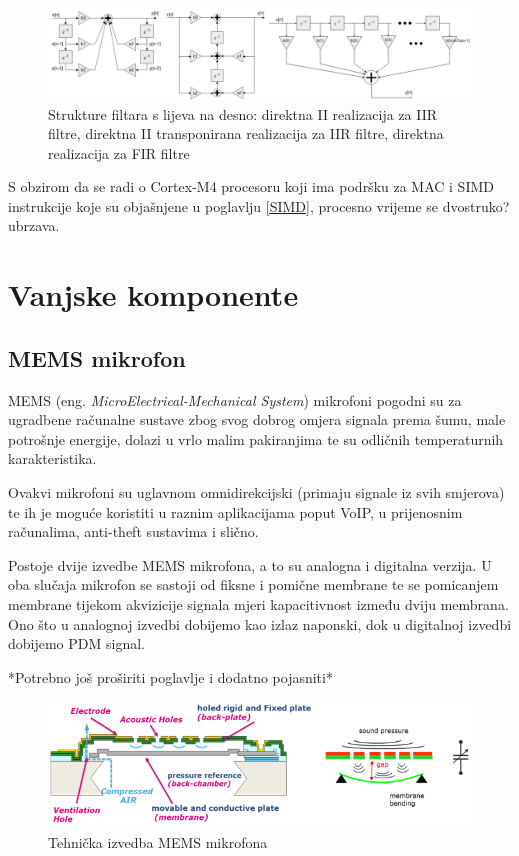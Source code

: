 \documentclass[times, utf8, diplomski]{fer}
\begin{document}
\begin{figure}[hbt!]
 \centering
 \includegraphics[scale=0.2]{photos/filtstruct.png}
 \caption{Strukture filtara s lijeva na desno: direktna II realizacija za IIR filtre, direktna II transponirana realizacija za IIR filtre, direktna realizacija za FIR filtre}
 \label{struct}
\end{figure}

S obzirom da se radi o Cortex-M4 procesoru koji ima podršku za MAC i SIMD instrukcije koje su objašnjene u poglavlju \ref{SIMD}, procesno vrijeme se dvostruko? ubrzava.

\section{Vanjske komponente}
\subsection{MEMS mikrofon}
MEMS (eng. \textit{MicroElectrical-Mechanical System}) mikrofoni pogodni su za ugradbene računalne sustave zbog svog dobrog omjera signala prema šumu, male potrošnje energije, dolazi u vrlo malim pakiranjima te su odličnih temperaturnih karakteristika.

Ovakvi mikrofoni su uglavnom omnidirekcijski (primaju signale iz svih smjerova) te ih je moguće koristiti u raznim aplikacijama poput VoIP, u prijenosnim računalima, anti-theft sustavima i slično.

Postoje dvije izvedbe MEMS mikrofona, a to su analogna i digitalna verzija. U oba slučaja mikrofon se sastoji od fiksne i pomične membrane te se pomicanjem membrane tijekom akvizicije signala mjeri kapacitivnost između dviju membrana. Ono što u analognoj izvedbi dobijemo kao izlaz naponski, dok u digitalnoj izvedbi dobijemo PDM signal.

*Potrebno još proširiti poglavlje i dodatno pojasniti*

\begin{figure}[hbt!]
 \centering
 \includegraphics[scale=0.8]{photos/gradjamems.png}
 \caption{Tehnička izvedba MEMS mikrofona}
 \label{MEMS}
\end{figure}
\end{document}
